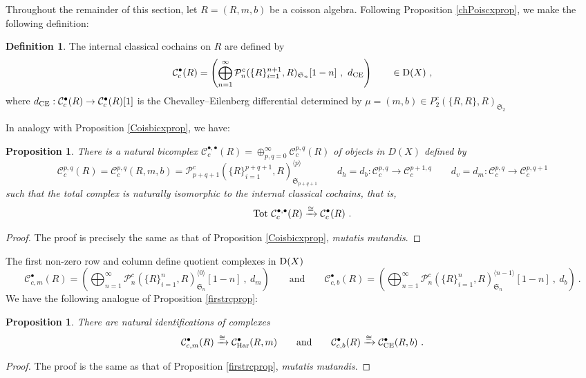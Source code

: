 \documentclass[11pt]{amsart}
\numberwithin{equation}{section}
\newtheorem{prop}[theo]{Proposition}
\theoremstyle{definition}
\newtheorem{defn}[theo]{Definition}
\newcommand{\mc}{\mathcal}
\newcommand{\mf}{\mathfrak}
\newcommand{\CE}{{\textup{CE}}}
\newcommand{\Ss}{{{\mf{S}}}}
\newcommand{\0}{{\textbf{0}}}
\newcommand{\Dd}{{\textup{D}}}
\newcommand{\DD}{{D}}
\def \mf{\mathfrak}
\begin{document}
Throughout the remainder of this section, let $R=(R,m,b)$ be a coisson algebra. Following Proposition \ref{chPoiscxprop}, we make the following definition:

\begin{defn} The internal classical cochains on $R$ are defined by
	\[ \mc C^\bullet_c(R) = \left( \bigoplus_{n=1}^\infty \mc P_n^c(\{R\}_{i=1}^{n+1},R)_{\Ss_n}[1-n] \ , \ d_\CE  \right) \qquad \in \Dd(X)\ , \]
where $d_\CE:\mc C^\bullet_c(R) \to \mc C^\bullet_c(R)[1]$ is the Chevalley--Eilenberg differential determined by $\mu=(m,b)\in P_2^c(\{R,R\},R)_{\Ss_2}$
\end{defn}

In analogy with Proposition \ref{Coisbicxprop}, we have:

\begin{prop}\label{Coisbicxintprop} There is a natural bicomplex $\mc C^{\bullet,\bullet}_c(R)=\oplus_{p,q=0}^\infty \mc C^{p,q}_c(R)$ of objects in $\DD(X)$ defined by
	\[\mc C^{p,q}_c(R)=\mc C^{p,q}_c(R,m,b)= \mc P_{p+q+1}^c(\{ R\}_{i=1}^{p+q+1},R)_{\Ss_{p+q+1}}^{\langle p \rangle } \qquad d_h=d_{b}:\mc C^{p,q}_c \to \mc C^{p+1,q}_c \qquad d_v=d_{m}:\mc C^{p,q}_c \to \mc C^{p,q+1}_c \]
	such that the total complex is naturally isomorphic to the internal classical cochains, that is, \[\textup{Tot } \mc C^{\bullet,\bullet}_c(R) \xrightarrow{\cong} \mc C_c^\bullet(R) \ .\]
\end{prop}
\begin{proof}
	The proof is precisely the same as that of Proposition \ref{Coisbicxprop}, \emph{mutatis mutandis}.
\end{proof}



The first non-zero row and column define quotient complexes in $\Dd(X)$
\[ \mc C^\bullet_{c,m}(R)=(\bigoplus_{n=1}^\infty  \mc  P_n^c(\{ R\}_{i=1}^n,R)_{\Ss_n}^{\langle 0 \rangle}[1-n] \ , \ d_{m} ) \qquad \text{and}\qquad \mc C^\bullet_{c,b}(R)=(\bigoplus_{n=1}^\infty \mc  P_n^c(\{ R\}_{i=1}^n,R)_{\Ss_n}^{\langle n-1 \rangle}[1-n]  \ , \ d_{b} )  \ . \]
We have the following analogue of Proposition \ref{firstrcprop}:

\begin{prop}There are natural identifications of complexes
	\[\mc C^\bullet_{c,m}(R) \xrightarrow{\cong} \mc C^\bullet_{\textup{Har}}(R,m) \qquad \text{and}\qquad  \mc C^\bullet_{c,b}(R) \xrightarrow{\cong} \mc C^\bullet_{\textup{CE}}(R,b)  \ . \]
\end{prop}
\begin{proof} The proof is the same as that of Proposition \ref{firstrcprop}, \emph{mutatis mutandis}.
\end{proof}
\end{document}
